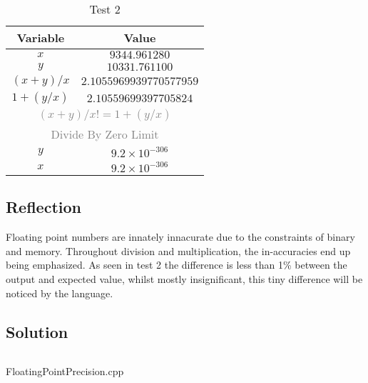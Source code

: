 \documentclass[main.tex]{subfiles}
\begin{document}
            \vspace{1cm}

            \begin{table}[H]
                \centering
                \begin{tabular}{c c}
                    \hline
                    \textbf{Variable} & \textbf{Value} \\
                    \hline
                    \(x\) & \(9344.961280\) \\
                    \(y\) & \(10331.761100\) \\
                    \hline
                    \hline
                    \((x + y) / x\) & \(2.1055969939770577959\) \\
                    \(1 + (y / x)\) & \(2.10559699397705824\) \\
                    \multicolumn{2}{c}{\textcolor{gray}{\((x + y) / x != 1 + ( y / x)\)}} \\
                    \hline
                    \hline
                    \multicolumn{2}{c}{\textcolor{gray}{Divide By Zero Limit}} \\
                    \(y\) & \(9.2 \times 10^{-306}\) \\
                    \(x\) & \(9.2 \times 10^{-306}\) \\
                    \hline
                \end{tabular}
                \caption{Test 2}
            \end{table}

        \subsection{Reflection}
            Floating point numbers are innately innacurate due to the constraints of binary and memory.
            Throughout division and multiplication, the in-accuracies end up being emphasized. As seen in
            test 2 the difference is less than 1\% between the output and expected value, whilst mostly insignificant,
            this tiny difference will be noticed by the language. 

        \subsection{Solution}
            \begin{listing}[H]
                \inputminted[firstline=10]{cpp}{../Tasks/04-FloatingPointPrecision/FloatingPointPrecision.cpp}
                \caption{FloatingPointPrecision.cpp}
            \end{listing}
\end{document}
